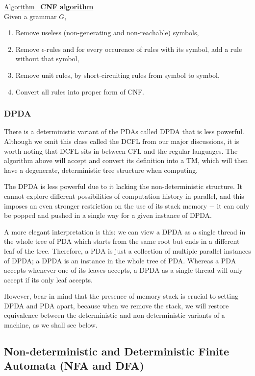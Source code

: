 \documentclass[12pt]{article}  %
\newcommand{\algtitle}[1]{\underline{Algorithm \ {\bf #1}} \vspace*{1mm}\\}
\begin{document}
\algtitle{CNF algorithm}
Given a grammar $G$,
\begin{enumerate}
	\item Remove useless (non-generating and non-reachable) symbols,
	\item Remove $\epsilon$-rules and for every occurence of rules with its symbol, add a rule without that symbol,
	\item Remove unit rules, by short-circuiting rules from symbol to symbol,
	\item Convert all rules into proper form of CNF.
\end{enumerate}

\subsubsection{DPDA}

There is a deterministic variant of the PDAs called DPDA that is less powerful. Although we omit this class called the DCFL from our major discussions, it is worth noting that DCFL sits in between CFL and the regular languages. The algorithm above will accept and convert its definition into a TM, which will then have a degenerate, deterministic tree structure when computing.

The DPDA is less powerful due to it lacking the non-deterministic structure. It cannot explore different possibilities of computation history in parallel, and this imposes an even stronger restriction on the use of its stack memory $-$ it can only be popped and pushed in a single way for a given instance of DPDA. 

A more elegant interpretation is this: we can view a DPDA as a single thread in the whole tree of PDA which starts from the same root but ends in a different leaf of the tree. Therefore, a PDA is just a collection of multiple parallel instances of DPDA; a DPDA is an instance in the whole tree of PDA. Whereas a PDA accepts whenever one of its leaves accepts, a DPDA as a single thread will only accept if its only leaf accepts. 

However, bear in mind that the presence of memory stack is crucial to setting DPDA and PDA apart, because when we remove the stack, we will restore equivalence between the deterministic and non-deterministic variants of a machine, as we shall see below.



\subsection{Non-deterministic and Deterministic Finite Automata (NFA and DFA)}
\end{document}
